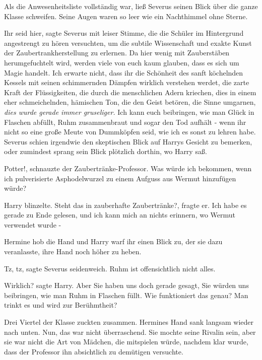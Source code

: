 Als die Anwesenheitsliste vollständig war, ließ Severus seinen Blick über die
ganze Klasse schweifen. Seine Augen waren so leer wie ein Nachthimmel ohne
Sterne.

\glqq{}Ihr seid hier\grqq{}, sagte Severus mit leiser Stimme, die die Schüler im
Hintergrund angestrengt zu hören versuchten, \glqq{}um die subtile Wissenschaft
und exakte Kunst der Zaubertrankherstellung zu erlernen. Da hier wenig mit
Zauberstäben herumgefuchtelt wird, werden viele von euch kaum glauben, dass es
sich um Magie handelt. Ich erwarte nicht, dass ihr die Schönheit des sanft
köchelnden Kessels mit seinen schimmernden Dämpfen wirklich verstehen werdet,
die zarte Kraft der Flüssigkeiten, die durch die menschlichen Adern
kriechen\grqq{}, dies in einem eher schmeichelnden, hämischen Ton, \glqq{}die den
Geist betören, die Sinne umgarnen\grqq{}, \emph{dies wurde gerade immer
gruseliger.} \glqq{}Ich kann euch beibringen, wie man Glück in Flaschen abfüllt,
Ruhm zusammenbraut und sogar den Tod aufhält - wenn ihr nicht so eine große
Meute von Dummköpfen seid, wie ich es sonst zu lehren habe.\grqq{} Severus
schien irgendwie den skeptischen Blick auf Harrys Gesicht zu bemerken, oder
zumindest sprang sein Blick plötzlich dorthin, wo Harry saß.

\glqq{}Potter!\grqq{}, schnauzte der Zaubertränke-Professor. \glqq{}Was würde ich
bekommen, wenn ich pulverisierte Asphodelwurzel zu einem Aufguss aus Wermut
hinzufügen würde?\grqq{}

Harry blinzelte. \glqq{}Steht das in zauberhafte Zaubertränke?\grqq{}, fragte er.
\glqq{}Ich habe es gerade zu Ende gelesen, und ich kann mich an nichts erinnern,
wo Wermut verwendet wurde -\grqq{}

Hermine hob die Hand und Harry warf ihr einen Blick zu, der sie dazu
veranlasste, ihre Hand noch höher zu heben.

\glqq{}Tz, tz\grqq{}, sagte Severus seidenweich. \glqq{}Ruhm ist offensichtlich
nicht alles.\grqq{}

\glqq{}Wirklich?\grqq{} sagte Harry. \glqq{}Aber Sie haben uns doch gerade gesagt,
Sie würden uns beibringen, wie man Ruhm in Flaschen füllt. Wie funktioniert das
genau? Man trinkt es und wird zur Berühmtheit?\grqq{}

Drei Viertel der Klasse zuckten zusammen. Hermines Hand sank langsam wieder nach
unten. Nun, das war nicht überraschend. Sie mochte seine Rivalin sein, aber sie
war nicht die Art von Mädchen, die mitspielen würde, nachdem klar wurde, dass
der Professor ihn absichtlich zu demütigen versuchte.

